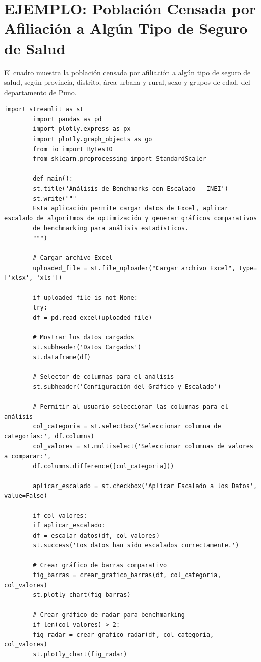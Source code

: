 	\section{EJEMPLO: Población Censada por Afiliación a Algún Tipo de Seguro de Salud}
	
	El cuadro muestra la población censada por afiliación a algún tipo de seguro de salud, según provincia, distrito, área urbana y rural, sexo y grupos de edad, del departamento de Puno.
	
	\begin{lstlisting}[caption={Análisis de Benchmarks con Escalado - INETI}]
		import streamlit as st
		import pandas as pd
		import plotly.express as px
		import plotly.graph_objects as go
		from io import BytesIO
		from sklearn.preprocessing import StandardScaler
		
		def main():
		st.title('Análisis de Benchmarks con Escalado - INEI')
		st.write("""
		Esta aplicación permite cargar datos de Excel, aplicar escalado de algoritmos de optimización y generar gráficos comparativos
		de benchmarking para análisis estadísticos.
		""")
		
		# Cargar archivo Excel
		uploaded_file = st.file_uploader("Cargar archivo Excel", type=['xlsx', 'xls'])
		
		if uploaded_file is not None:
		try:
		df = pd.read_excel(uploaded_file)
		
		# Mostrar los datos cargados
		st.subheader('Datos Cargados')
		st.dataframe(df)
		
		# Selector de columnas para el análisis
		st.subheader('Configuración del Gráfico y Escalado')
		
		# Permitir al usuario seleccionar las columnas para el análisis
		col_categoria = st.selectbox('Seleccionar columna de categorías:', df.columns)
		col_valores = st.multiselect('Seleccionar columnas de valores a comparar:', 
		df.columns.difference([col_categoria]))
		
		aplicar_escalado = st.checkbox('Aplicar Escalado a los Datos', value=False)
		
		if col_valores:
		if aplicar_escalado:
		df = escalar_datos(df, col_valores)
		st.success('Los datos han sido escalados correctamente.')
		
		# Crear gráfico de barras comparativo
		fig_barras = crear_grafico_barras(df, col_categoria, col_valores)
		st.plotly_chart(fig_barras)
		
		# Crear gráfico de radar para benchmarking
		if len(col_valores) > 2:
		fig_radar = crear_grafico_radar(df, col_categoria, col_valores)
		st.plotly_chart(fig_radar)
		

\end{lstlisting}
